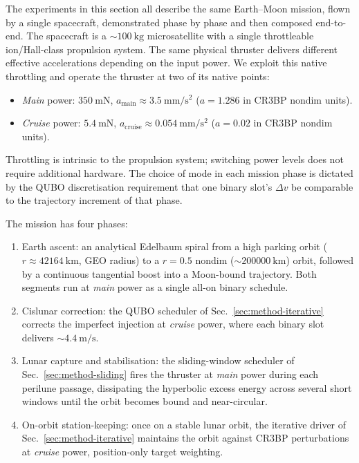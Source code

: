 \documentclass[11pt,a4paper]{article}
\theoremstyle{plain}
\begin{document}
The experiments in this section all describe the same Earth--Moon
mission, flown by a single spacecraft, demonstrated phase by phase
and then composed end-to-end. The spacecraft is a
$\sim\SI{100}{\kg}$ microsatellite with a single throttleable
ion/Hall-class propulsion system. The same physical thruster
delivers different effective accelerations depending on the input
power. We exploit this native throttling and operate the thruster
at two of its native points:
\begin{itemize}[leftmargin=1.5em, itemsep=1pt]
  \item \emph{Main} power: $\SI{350}{\milli\newton}$,
    $a_\mathrm{main} \approx \SI{3.5}{\milli\meter\per\second\squared}$
    ($a = 1.286$ in CR3BP nondim units).
  \item \emph{Cruise} power: $\SI{5.4}{\milli\newton}$,
    $a_\mathrm{cruise} \approx \SI{0.054}{\milli\meter\per\second\squared}$
    ($a = 0.02$ in CR3BP nondim units).
\end{itemize}
Throttling is intrinsic to the propulsion system; switching power
levels does not require additional hardware. The choice of mode in
each mission phase is dictated by the QUBO discretisation
requirement that one binary slot's $\Delta v$ be comparable to the
trajectory increment of that phase.

The mission has four phases:
\begin{enumerate}[leftmargin=1.5em, itemsep=1pt]
  \item[\textbf{Phase 1}] Earth ascent: an analytical Edelbaum spiral
    \cite{Edelbaum1961} from a high parking orbit
    ($r \approx \SI{42164}{\km}$, GEO radius) to a $r = 0.5$
    nondim ($\sim \SI{200000}{\km}$) orbit, followed by a
    continuous tangential boost into a Moon-bound trajectory.
    Both segments run at \emph{main} power as a single all-on
    binary schedule.
  \item[\textbf{Phase 2}] Cislunar correction: the QUBO scheduler
    of Sec.~\ref{sec:method-iterative} corrects the imperfect
    injection at \emph{cruise} power, where each binary slot
    delivers $\sim \SI{4.4}{\meter\per\second}$.
  \item[\textbf{Phase 3}] Lunar capture and stabilisation: the
    sliding-window scheduler of Sec.~\ref{sec:method-sliding}
    fires the thruster at \emph{main} power during each perilune
    passage, dissipating the hyperbolic excess energy across
    several short windows until the orbit becomes bound and
    near-circular.
  \item[\textbf{Phase 4}] On-orbit station-keeping: once on a stable
    lunar orbit, the iterative driver of
    Sec.~\ref{sec:method-iterative} maintains the orbit against
    CR3BP perturbations at \emph{cruise} power, position-only
    target weighting.
\end{enumerate}
\end{document}
